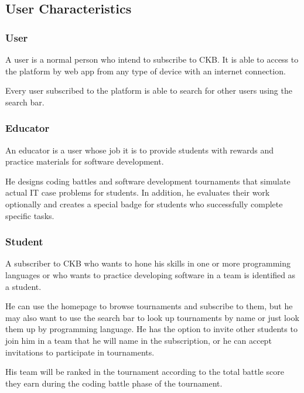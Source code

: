 \subsection{User Characteristics}

\subsubsection{User}
A user is a normal person who intend to subscribe to CKB. It is able to access to the platform by web app from any type of device with an internet connection.

Every user subscribed to the platform is able to search for other users using the search bar.

\subsubsection{Educator}
An educator is a user whose job it is to provide students with rewards and practice materials for software development.

He designs coding battles and software development tournaments that simulate actual IT case problems for students. In addition, he evaluates their work optionally and creates a special badge for students who successfully complete 
specific tasks.

\subsubsection{Student}
A subscriber to CKB who wants to hone his skills in one or more programming languages or who wants to practice developing software in a team is identified as a student.

He can use the homepage to browse tournaments and subscribe to them, but he may also want to use the search bar to look up tournaments by name or just look them up by programming language. He has the option to invite other students
to join him in a team that he will name in the subscription, or he can accept invitations to participate in tournaments.

His team will be ranked in the tournament according to the total battle score they earn during the coding battle phase of the tournament.

